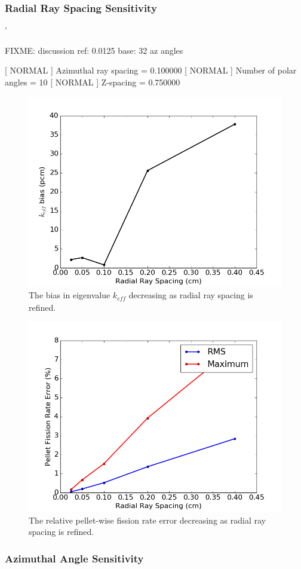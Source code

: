 \subsubsection{Radial Ray Spacing Sensitivity}'

FIXME: discussion
ref: 0.0125
base: 32 az angles

[  NORMAL ]  Azimuthal ray spacing = 0.100000
[  NORMAL ]  Number of polar angles = 10
[  NORMAL ]  Z-spacing = 0.750000


\begin{figure}[h!]
	\centering
	\includegraphics[width=0.7\linewidth]{figures/results/sensitivity/rad_spacing_pcm.png}
	\caption[]{The bias in eigenvalue $k_{\textit{eff}}$ decreasing as radial ray spacing is refined.}
	\label{fig:radial-rs-pcm}
\end{figure}
\begin{figure}[h!]
	\centering
	\includegraphics[width=0.7\linewidth]{figures/results/sensitivity/rad_spacing_fr.png}
	\caption[]{The relative pellet-wise fission rate error decreasing as radial ray spacing is refined.}
	\label{fig:radial-rs-fr}
\end{figure}


\subsubsection{Azimuthal Angle Sensitivity}

